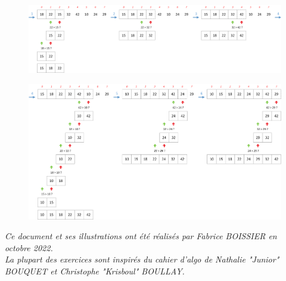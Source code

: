 \documentclass[11pt,a4paper]{article}
\begin{document}
\begin{figure}[ht!]
\centering
\centerline{
\includegraphics[width=1.18\textwidth]{img/InsertionSort_part1_2.png}
}
\end{figure}

\begin{figure}[ht!]
\centering
\centerline{
\includegraphics[width=1.18\textwidth]{img/InsertionSort_part2.png}
}
\end{figure}

\clearpage




\vfillFirst

\vfillLast


\begin{center}
\textit{Ce document et ses illustrations ont été réalisés par Fabrice BOISSIER en octobre 2022.\\
La plupart des exercices sont inspirés du cahier d'algo de Nathalie "Junior" BOUQUET et Christophe "Krisboul" BOULLAY.}
\end{center}
\end{document}
